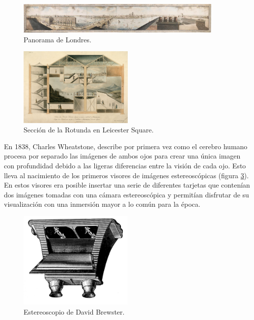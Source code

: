 \begin{figure}
  \centering
\includegraphics[width=0.9\textwidth]{03.EstudioProblema/01.EstadoArte/00.Figuras/12.panorama_london.jpg}
    \caption{Panorama de Londres. \cite{EA_img_london}}
    \label{fig:EA_london}
\end{figure}

\begin{figure}
  \centering
\includegraphics[width=0.5\textwidth]{03.EstudioProblema/01.EstadoArte/00.Figuras/13.panorama_rotunda.jpg}
    \caption{Sección de la Rotunda en Leicester Square. \cite{EA_img_rotunda}}
    \label{fig:EA_rotunda}
\end{figure}


\label{par:estadoArte:estereoscopio}
En 1838, Charles Wheatstone, describe por primera vez como el cerebro humano procesa por separado las imágenes de ambos ojos para crear una única imagen con profundidad debido a las ligeras diferencias entre la visión de cada ojo. \cite{EA_vr_estereoscopia} Esto lleva al nacimiento de los primeros visores de imágenes estereoscópicas (figura \ref{fig:EA_estereoscopio}). En estos visores era posible insertar una serie de diferentes tarjetas que contenían dos imágenes tomadas con una cámara estereoscópica y permitían disfrutar de su visualización con una inmersión mayor a lo común para la época.


\begin{figure}
  \centering
\includegraphics[width=0.5\textwidth]{03.EstudioProblema/01.EstadoArte/00.Figuras/14.panorama_estereoscopico.jpg}
    \caption{Estereoscopio de David Brewster. \cite{EA_img_estereoscopio}}
    \label{fig:EA_estereoscopio}
\end{figure}




